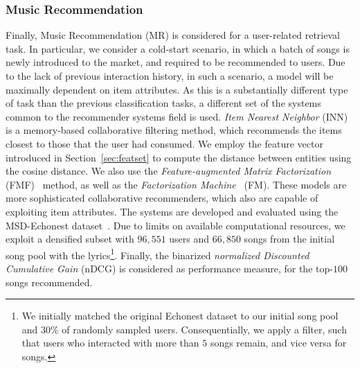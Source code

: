 \documentclass{article}
\begin{document}
\subsubsection{Music Recommendation}\label{sec:exp:task:recsys}
Finally, Music Recommendation (MR) is considered for a user-related retrieval task. In particular, we consider a cold-start scenario, in which a batch of songs is newly introduced to the market, and required to be recommended to users. Due to the lack of previous interaction history, in such a scenario, a model will be maximally dependent on item attributes.
As this is a substantially different type of task than the previous classification tasks, a different set of the systems common to the recommender systems field is used. \emph{Item Nearest Neighbor} (INN) is a memory-based collaborative filtering method, which recommends the items closest to those that the user had consumed. We employ the feature vector introduced in Section~\ref{sec:featset} to compute the distance between entities using the cosine distance. We also use the \emph{Feature-augmented Matrix Factorization} (FMF)~\cite{DBLP:conf/ismir/LiangZE15} method, as well as the \emph{Factorization Machine}~\cite{DBLP:conf/icdm/Rendle10} (FM). These models are more sophisticated collaborative recommenders, which also are capable of exploiting item attributes.
The systems are developed and evaluated using the MSD-Echonest dataset~\cite{DBLP:conf/ismir/Bertin-MahieuxEWL11}. Due to limits on available computational resources, we exploit a densified subset with $96,551$ users and $66,850$ songs from the initial song pool with the lyrics\footnote{We initially matched the original Echonest dataset to our initial song pool and $30\%$ of randomly sampled users. Consequentially, we apply a filter, such that users who interacted with more than $5$ songs remain, and vice versa for songs.}. Finally, the binarized \emph{normalized Discounted Cumulative Gain} (nDCG) is considered as performance measure, for the top-$100$ songs recommended.
\end{document}
